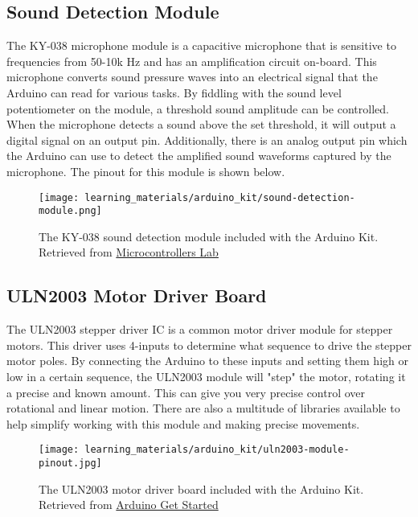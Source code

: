     \subsection*{Sound Detection Module}
    The KY-038 microphone module is a capacitive microphone that is sensitive to frequencies from 50-10k Hz and has an amplification circuit on-board.
    This microphone converts sound pressure waves into an electrical signal that the Arduino can read for various tasks.
    By fiddling with the sound level potentiometer on the module, a threshold sound amplitude can be controlled.
    When the microphone detects a sound above the set threshold, it will output a digital signal on an output pin.
    Additionally, there is an analog output pin which the Arduino can use to detect the amplified sound waveforms captured by the microphone.
    The pinout for this module is shown below.

    \begin{figure}[h!]
        \texttt{[image: learning\_materials/arduino\_kit/sound-detection-module.png]}
        \caption[Sound Detection Module]{The KY-038 sound detection module included with the Arduino Kit. 
        Retrieved from \href{https://microcontrollerslab.com/ky-038-microphone-sound-sensor-module-arduino-tutorial/}
        {Microcontrollers Lab}}
    \end{figure}

    \subsection*{ULN2003 Motor Driver Board}
    The ULN2003 stepper driver IC is a common motor driver module for stepper motors. 
    This driver uses 4-inputs to determine what sequence to drive the stepper motor poles.
    By connecting the Arduino to these inputs and setting them high or low in a certain sequence, the ULN2003 module will "step" the motor, rotating it a precise and known amount.
    This can give you very precise control over rotational and linear motion.
    There are also a multitude of libraries available to help simplify working with this module and making precise movements.

    \begin{figure}[h!]
        \texttt{[image: learning\_materials/arduino\_kit/uln2003-module-pinout.jpg]}
        \caption[Motor Driver]{The ULN2003 motor driver board included with the Arduino Kit. 
        Retrieved from \href{https://arduinogetstarted.com/images/tutorial/uln2003-module-pinout.jpg}
        {Arduino Get Started}}
    \end{figure}

